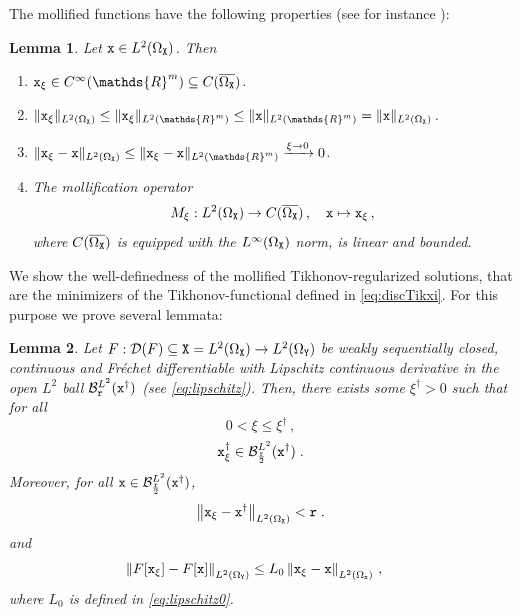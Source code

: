 \documentclass[10pt]{article}
\numberwithin{equation}{section}
\newtheorem{lemma}{Lemma}[section]
\theoremstyle{nonumberplain}
\newcommand{\R}{\mathds{R}}
\newcommand{\norm}[1]{\left\|#1\right\|}
\newcommand{\norms}[1]{\|#1\|}
\newcommand{\X}{{\tt X}}
\newcommand{\Y}{{\tt Y}}
\newcommand{\x}{{\tt x}}
\newcommand{\xdag}{\x^\dagger}
\begin{document}
The mollified functions have the following properties (see for instance \cite{AdaFou03,Eva10}): 
\begin{lemma} \label{le:molli} Let $\x \in L^2(\Omega_\X)$. Then 
	\begin{enumerate}
		\item $\x_\xi \in C^{\infty}(\R^m) \subseteq C(\overline{\Omega_\X})$.
		\item $\norms{\x_\xi}_{L^2(\Omega_\X)} \leq \norms{\x_\xi}_{L^2(\R^m)} \leq \norms{\x}_{L^2(\R^m)} = \norms{\x}_{L^2(\Omega_\X)}$.
		\item 
        $\norms{\x_\xi - \x}_{L^2(\Omega_\X)} \leq \norms{\x_\xi - \x}_{L^2(\R^m)}  \xrightarrow{\xi \to 0} 0$.
		\item The \emph{mollification operator}
			\begin{equation*}
				M_\xi: L^2(\Omega_\X) \to C(\overline{\Omega_\X})\,, \quad \x \mapsto \x_\xi\,,
			\end{equation*}
			where $C(\overline{\Omega_\X})$ is equipped with the $L^\infty(\Omega_\X)$ norm, is linear and bounded.
	\end{enumerate}
\end{lemma}
We show the well-definedness of the mollified Tikhonov-regularized solutions, that are the minimizers of the Tikhonov-functional defined in \autoref{eq:discTikxi}. For this purpose we prove several lemmata:
\begin{lemma}\label{le:l2 operator apx}
	Let $F: \mathcal{D}(F) \subseteq \X=L^2(\Omega_\X) \to L^2(\Omega_\Y)$ be weakly sequentially closed, continuous and Fr\'echet differentiable with Lipschitz continuous derivative in the open $L^2$ ball $\mathcal{B}^{L^2}_{\tt r}(\xdag)$ 
		(see \autoref{eq:lipschitz}). Then, there exists some $\xi^\dagger > 0$ such that for all
		\begin{equation} \label{eq:xidag}
			0 < \xi \leq \xi^\dagger\,,
		\end{equation}  
		\begin{equation} \label{eq:bound}
			\xdag_\xi \in \mathcal{B}^{L^2}_{\frac{\tt r}{2}}(\xdag)\;.
		\end{equation} 		
		Moreover, for all $\x \in \mathcal{B}_{\frac{\tt r}{2}}^{L^2}(\xdag)$,
		\begin{equation}\label{eq:help}
		\begin{aligned}
			\norm{\x_\xi-\xdag}_{L^2(\Omega_\X)} < \tt r\;.
		\end{aligned}
		\end{equation} 
		and
		\begin{equation} \label{eq:help1}
		\begin{aligned}
			\norm{F[\x_\xi]-F[\x]}_{L^2(\Omega_\Y)} &\leq L_0 \norm{\x_\xi-\x}_{L^2(\Omega_\x)}\,,
		\end{aligned}
		\end{equation}
		where $L_0$ is defined in \autoref{eq:lipschitz0}. 
\end{lemma}
\end{document}
